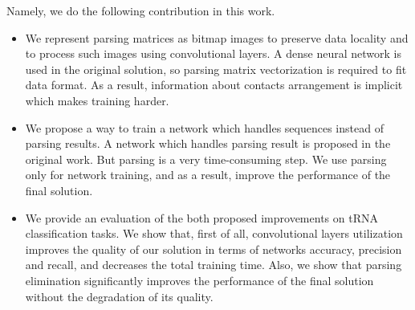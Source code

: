 Namely, we do the following contribution in this work.
\begin{itemize}
\item We represent parsing matrices as bitmap images to preserve data locality and to process such images using convolutional layers. 
A dense neural network is used in the original solution, so parsing matrix vectorization is required to fit data format. 
As a result, information about contacts arrangement is implicit which makes training harder.
\item  We propose a way to train a network which handles sequences instead of parsing results.
A network which handles parsing result is proposed in the original work. But parsing is a very time-consuming step. 
We use parsing only for network training, and as a result, improve the performance of the final solution.
\item We provide an evaluation of the both proposed improvements on tRNA classification tasks. 
We show that, first of all, convolutional layers utilization improves the quality of our solution in terms of networks accuracy, precision and recall, and decreases the total training time.
Also, we show that parsing elimination significantly improves the performance of the final solution without the degradation of its quality.
\end{itemize}